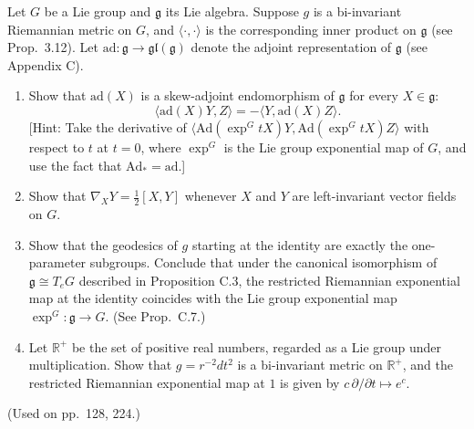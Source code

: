 \begin{exercise}
\label{prob:lie-group-bi-invariant-metric}

Let $G$ be a Lie group and $\mathfrak{g}$ its Lie algebra. Suppose $g$ is a bi-invariant Riemannian metric on $G$, and $\langle \cdot, \cdot \rangle$ is the corresponding inner product on $\mathfrak{g}$ (see Prop.\ 3.12). Let $\mathrm{ad}: \mathfrak{g} \to \mathfrak{gl}(\mathfrak{g})$ denote the adjoint representation of $\mathfrak{g}$ (see Appendix C).
\begin{enumerate}
\item[(a)] Show that $\mathrm{ad}(X)$ is a skew-adjoint endomorphism of $\mathfrak{g}$ for every $X \in \mathfrak{g}$:
\[
\langle \mathrm{ad}(X)Y, Z \rangle = -\langle Y, \mathrm{ad}(X)Z \rangle.
\]
[Hint: Take the derivative of $\langle \mathrm{Ad}(\exp^G tX)Y, \mathrm{Ad}(\exp^G tX)Z \rangle$ with respect to $t$ at $t = 0$, where $\exp^G$ is the Lie group exponential map of $G$, and use the fact that $\mathrm{Ad}_* = \mathrm{ad}$.]
\item[(b)] Show that $\nabla_X Y = \frac{1}{2}[X, Y]$ whenever $X$ and $Y$ are left-invariant vector fields on $G$.
\item[(c)] Show that the geodesics of $g$ starting at the identity are exactly the one-parameter subgroups. Conclude that under the canonical isomorphism of $\mathfrak{g} \cong T_e G$ described in Proposition C.3, the restricted Riemannian exponential map at the identity coincides with the Lie group exponential map $\exp^G : \mathfrak{g} \to G$. (See Prop.\ C.7.)
\item[(d)] Let $\mathbb{R}^+$ be the set of positive real numbers, regarded as a Lie group under multiplication. Show that $g = r^{-2} dt^2$ is a bi-invariant metric on $\mathbb{R}^+$, and the restricted Riemannian exponential map at $1$ is given by $c\,\partial/\partial t \mapsto e^c$.
\end{enumerate}
(Used on pp.\ 128, 224.)
\end{exercise}


